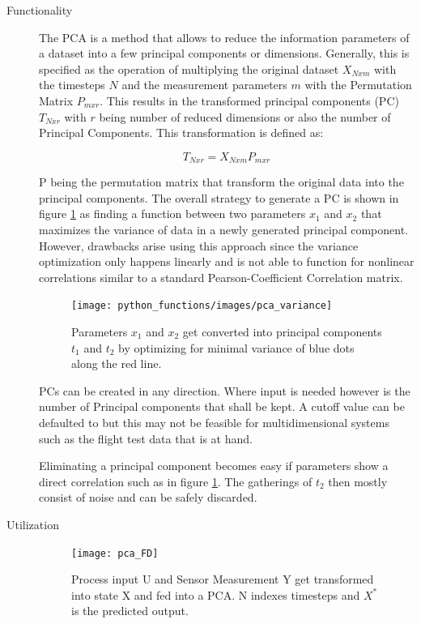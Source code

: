 \begin{description}
    \item[Functionality]\hfill

    The PCA is a method that allows to reduce the information parameters of a dataset into a few principal components or dimensions. Generally, this is specified as the operation of multiplying the original dataset $X_{Nxm}$ with the timesteps $N$ and the measurement parameters $m$ with the Permutation Matrix $P_{mxr}$. This results in the transformed principal components (PC) $T_{Nxr}$ with $r$ being number of reduced dimensions or also the number of Principal Components. This transformation is defined as:

    $$T_{Nxr} = X_{Nxm}  P_{mxr}$$

    P being the permutation matrix that transform the original data into the principal components. The overall strategy to generate a PC is shown in figure \ref{fig:pca_variance} as finding a function between two parameters $x_1$ and $x_2$ that maximizes the variance of data in a newly generated principal component. However, drawbacks arise using this approach since the variance optimization only happens linearly and is not able to function for nonlinear correlations similar to a standard Pearson-Coefficient Correlation matrix. \cite{handl_multivariate_2017}

    \begin{figure}[h]
        \centering
        \texttt{[image: python\_functions/images/pca\_variance]}
        \caption[Illustration of a singular PCA Transformation]{Parameters $x_1$ and $x_2$ get converted into principal components $t_1$ and $t_2$ by optimizing for minimal variance of blue dots along the red line.}
        \label{fig:pca_variance}
    \end{figure}

    PCs can be created in any direction. Where input is needed however is the number of Principal components that shall be kept. A cutoff value can be defaulted to but this may not be feasible for multidimensional systems such as the flight test data that is at hand.


    Eliminating a principal component becomes easy if parameters show a direct correlation such as in figure \ref{fig:pca_variance}. The gatherings of $t_2$ then mostly consist of noise and can be safely discarded.

    \item[Utilization]\hfill

    \begin{figure}[h]
        \vspace{-20pt}
        \centering
        \texttt{[image: pca\_FD]}
        \caption{Process input U and Sensor Measurement Y get transformed into state X and fed into a PCA. N indexes timesteps and $X^*$ is the predicted output.\cite[p.268]{isermann_fault-diagnosis_2006}}
        \label{fig:pca_FD}
    \end{figure}


\end{description}
